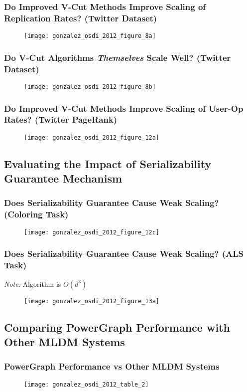 \begin{frame}
  \frametitle{\small{Do Improved V-Cut Methods Improve Scaling of Replication
              Rates? (Twitter Dataset)}}
  \centering
  \begin{figure}
    \texttt{[image: gonzalez\_osdi\_2012\_figure\_8a]}
    \caption{\cite[OSDI '12]{gonzalez2012powergraph}}
  \end{figure}
\end{frame}

\begin{frame}
  \frametitle{\small Do V-Cut Algorithms \textit{Themselves} Scale Well?
              (Twitter Dataset)}
  \centering
  \begin{figure}
    \texttt{[image: gonzalez\_osdi\_2012\_figure\_8b]}
    \caption{\cite[OSDI '12]{gonzalez2012powergraph}}
  \end{figure}
\end{frame}

\begin{frame}
  \frametitle{\small Do Improved V-Cut Methods Improve Scaling of User-Op Rates?
              (Twitter PageRank)}
  \centering
  \begin{figure}
    \texttt{[image: gonzalez\_osdi\_2012\_figure\_12a]}
    \caption{\cite[OSDI '12]{gonzalez2012powergraph}}
  \end{figure}
\end{frame}


\subsection{Evaluating the Impact of Serializability Guarantee Mechanism}

\begin{frame}
  \frametitle{\small Does Serializability Guarantee Cause Weak Scaling? (Coloring Task)}
  \centering
  \begin{figure}
    \texttt{[image: gonzalez\_osdi\_2012\_figure\_12c]}
    \caption{\cite[OSDI '12]{gonzalez2012powergraph}}
  \end{figure}
\end{frame}

\begin{frame}
  \frametitle{\small Does Serializability Guarantee Cause Weak Scaling? (ALS Task)}
  \centering
  \textit{Note:} Algorithm is $O(d^3)$
  \begin{figure}
    \texttt{[image: gonzalez\_osdi\_2012\_figure\_13a]}
    \caption{\cite[OSDI '12]{gonzalez2012powergraph}}
  \end{figure}
\end{frame}


\subsection{Comparing PowerGraph Performance with Other MLDM Systems}

\begin{frame}
  \frametitle{PowerGraph Performance vs Other MLDM Systems}
  \begin{figure}
    \texttt{[image: gonzalez\_osdi\_2012\_table\_2]}
    \caption{\cite[OSDI '12]{gonzalez2012powergraph}}
  \end{figure}
\end{frame}
